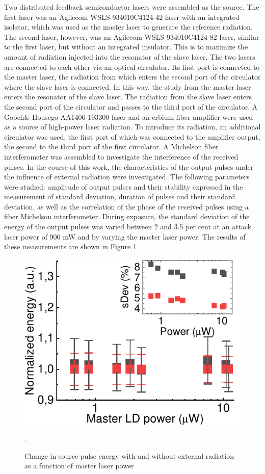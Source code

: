 Two distributed feedback semiconductor lasers were assembled as the source. The first laser was an Agilecom WSLS-934010C4124-42 laser with an integrated isolator, which was used as the master laser to generate the reference radiation. The second laser, however, was an Agilecom WSLS-934010C4124-82 laser, similar to the first laser, but without an integrated insulator. This is to maximize the amount of radiation injected into the resonator of the slave laser. The two lasers are connected to each other via an optical circulator. Its first port is connected to the master laser, the radiation from which enters the second port of the circulator where the slave laser is connected. In this way, the study from the master laser enters the resonator of the slave laser. The radiation from the slave laser enters the second port of the circulator and passes to the third port of the circulator. A Gooch\& Housego AA1406-193300 laser and an erbium fiber amplifier were used as a source of high-power laser radiation. To introduce its radiation, an additional circulator was used, the first port of which was connected to the amplifier output, the second to the third port of the first circulator. A Michelson fiber interferometer was assembled to investigate the interference of the received pulses.
\newline In the course of this work, the characteristics of the output pulses under the influence of external radiation were investigated. The following parameters were studied: amplitude of output pulses and their stability expressed in the measurement of standard deviation, duration of pulses and their standard deviation, as well as the correlation of the phase of the received pulses using a fiber Michelson interferometer. During exposure, the standard deviation of the energy of the output pulses was varied between 2 and 3.5 per cent at an attack laser power of 900 mW and by varying the master laser power. The results of these measurements are shown in Figure \ref{fig:area MDI syn}
\begin{figure}
    \centering
    \includegraphics{images/area_under_attack.pdf}
    \caption{Change in source pulse energy with and without external radiation as a function of master laser power}.
    \label{fig:area MDI syn}
\end{figure}
